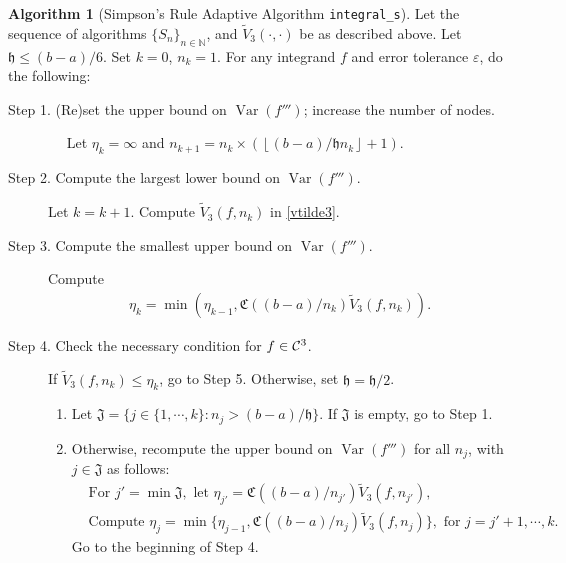 \documentclass{iitthesis}
\DeclareMathOperator{\Var}{Var}
\theoremstyle{definition}
\newtheorem{algo}{Algorithm}
\theoremstyle{remark}
\begin{document}
\begin{algo} [Simpson's Rule Adaptive Algorithm {\tt integral\_s}] \label{multistageintegalgosimpson}
Let the sequence of algorithms $\{S_n\}_{n\in \mathbb{N}}$, %
and $\widetilde{V}_3(\cdot,\cdot)$ be as described above.
Let $\mathfrak{h}\le (b-a)/6$. Set $k=0$, $n_{k}=1$. For any integrand $f$ and error tolerance $\varepsilon$, do the following: %
\begin{description}
\item[Step 1. (Re)set the upper bound on $\Var(f''')$; increase the number of nodes.] $\quad$ Let $\eta_{k}=\infty$ and $n_{k+1}=n_k\times\left(\left\lfloor(b-a)/\mathfrak{h}n_{k}\right\rfloor+1\right)$.

\item[Step 2. Compute the largest lower bound on {$\Var(f''')$}.] Let $k=k+1$. Compute  $\widetilde{V}_3(f,n_k)$ in \eqref{vtilde3}.%

\item[Step 3. Compute the smallest upper bound on {$\Var(f''')$}.] Compute
    \begin{align*}
        \eta_{k}=\min\left(\eta_{k-1},\mathfrak{C}((b-a)/n_{k})\widetilde{V}_3(f,n_k)\right).
    \end{align*}

\item[Step 4. Check the necessary condition for $f \in \mathcal{C}^3$.] If $\widetilde{V}_3(f,n_k) \le \eta_{k}$, go to Step 5.
  Otherwise, set $\mathfrak{h} = \mathfrak{h}/2$.
    \begin{enumerate}[label=\alph*)]
      \item Let $\mathfrak{J}=\{j\in\{1,\cdots,k\}: n_{j}> (b-a)/\mathfrak{h}\}$. If $\mathfrak{J}$ is empty, go to Step 1.
      \item Otherwise, recompute the upper bound on $\Var(f''')$ for all $n_{j}$, with $j \in \mathfrak{J}$ as follows:
      \begin{align*}
        &\text{For } j'=\min\mathfrak{J}, \text{ let } \eta_{j'}=\mathfrak{C}((b-a)/n_{j'})\widetilde{V}_3(f,n_{j'}), \\
        &\text{Compute } \eta_{j}=\min\{\eta_{j-1},\mathfrak{C}((b-a)/n_{j})\widetilde{V}_3(f,n_{j})\}, \text{ for } j=j'+1, \cdots, k.
      \end{align*}
      Go to the beginning of Step 4.
    \end{enumerate}



\end{description}
\end{algo}
\end{document}
